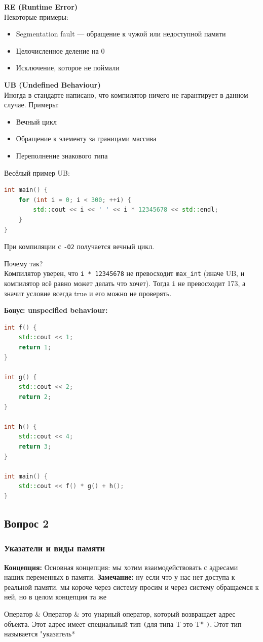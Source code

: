 \textbf{RE (Runtime Error)}\\
Некоторые примеры:
\begin{itemize}
    \item Segmentation fault --- обращение к чужой или недоступной памяти
    \item Целочисленное деление на 0
    \item Исключение, которое не поймали
\end{itemize}

\textbf{UB (Undefined Behaviour)}\\
Иногда в стандарте написано, что компилятор ничего не гарантирует в данном случае. Примеры:
\begin{itemize}
    \item Вечный цикл
    \item Обращение к элементу за границами массива
    \item Переполнение знакового типа
\end{itemize}

Весёлый пример UB:
\begin{lstlisting}[language=C++]
int main() {
    for (int i = 0; i < 300; ++i) {
        std::cout << i << ' ' << i * 12345678 << std::endl;
    }
}
\end{lstlisting}
При компиляции с \texttt{-O2} получается вечный цикл.

Почему так?\\
Компилятор уверен, что \texttt{i * 12345678} не превосходит \texttt{max\_int} (иначе UB, и компилятор всё равно может делать что хочет). Тогда \texttt{i} не превосходит 173, а значит условие всегда true и его можно не проверять.

\textbf{Бонус: unspecified behaviour:}
\begin{lstlisting}[language=C++]
int f() {
    std::cout << 1;
    return 1;
}

int g() {
    std::cout << 2;
    return 2;
}

int h() {
    std::cout << 4;
    return 3;
}

int main() {
    std::cout << f() * g() + h();
}
\end{lstlisting}

\newpage
\subsection{Вопрос 2}
\subsubsection{Указатели и виды памяти}
\textbf{Концепция:} Основная концепция: мы хотим взаимодействовать с адресами наших переменных в памяти.
\textbf{Замечание:} ну если что у нас нет доступа к реальной памяти, мы короче через систему просим и через систему обращаемся к ней, но в целом концепция та же
\begin{definition}
{Оператор \&}{}
Оператор \& это унарный оператор, который возвращает адрес объекта. Этот адрес имеет специальный тип \texttt{(}для типа T это T* \texttt{)}. Этот тип называется "указатель*
\end{definition}
